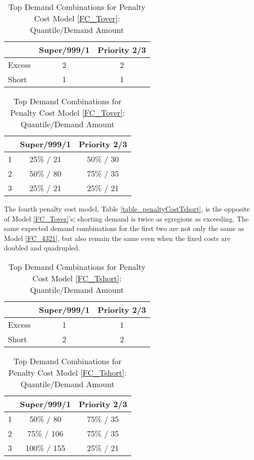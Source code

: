 \begin{table}[H]
\centering
\begin{minipage}[b]{0.4\textwidth}
\caption{Penalty Cost Model \ref{FC_Tover}}
\label{table_penaltyCostTover}
\begin{tabular}{@{}lcc@{}}
\toprule
 & Super/999/1 & Priority 2/3 \\ \midrule
Excess & 2 & 2 \\
Short & 1 & 1 \\ \bottomrule
\end{tabular}
\end{minipage}
\hspace{10mm}
\begin{minipage}[b]{0.4\textwidth}
\caption{Top Demand Combinations for Penalty Cost Model \ref{FC_Tover}: Quantile/Demand Amount}
\label{table_top3_Tover}
\begin{tabular}{@{}lcc@{}}
\toprule
 & Super/999/1 & Priority 2/3 \\ \midrule
1 & 25\% / 21 & 50\% / 30 \\
2 & 50\% / 80 & 75\% / 35 \\
3 & 25\% / 21 & 25\% / 21 \\ \bottomrule
\end{tabular}
\end{minipage}
\end{table}
The fourth penalty cost model\label{FC_Tshort}, Table \ref{table_penaltyCostTshort}, is the opposite of Model \ref{FC_Tover}'s; shorting demand is twice as egregious as exceeding. The same expected demand combinations for the first two are not only the same as Model \ref{FC_4321}, but also remain the same even when the fixed costs are doubled and quadrupled.
\begin{table}[H]
\centering
\begin{minipage}[b]{0.4\textwidth}
\caption{Penalty Cost Model \ref{FC_Tshort}}
\label{table_penaltyCostTshort}
\begin{tabular}{@{}lcc@{}}
\toprule
 & Super/999/1 & Priority 2/3 \\ \midrule
Excess & 1 & 1 \\
Short & 2 & 2 \\ \bottomrule
\end{tabular}
\end{minipage}
\hspace{10mm}
\begin{minipage}[b]{0.4\textwidth}
\caption{Top Demand Combinations for Penalty Cost Model \ref{FC_Tshort}: Quantile/Demand Amount}
\label{table_top3_Tshort}
\begin{tabular}{@{}lcc@{}}
\toprule
 & Super/999/1 & Priority 2/3 \\ \midrule
1 & 50\% / 80 & 75\% / 35 \\
2 & 75\% / 106 & 75\% / 35 \\
3 & 100\% / 155 & 25\% / 21 \\ \bottomrule
\end{tabular}
\end{minipage}
\end{table}
